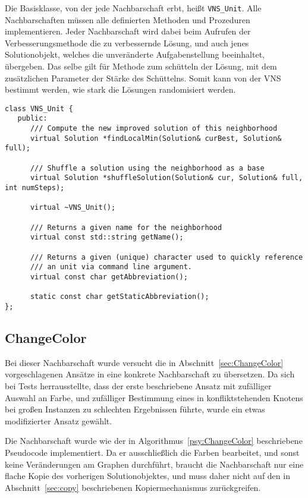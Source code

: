Die Basisklasse, von der jede Nachbarschaft erbt, heißt \texttt{VNS\_Unit}. Alle Nachbarschaften müssen alle definierten Methoden und Prozeduren implementieren. Jeder Nachbarschaft wird dabei beim Aufrufen der
Verbesserungsmethode die zu verbessernde Lösung, und auch jenes Solutionobjekt, welches die unveränderte Aufgabenstellung beeinhaltet, übergeben. Das selbe gilt für Methode zum schütteln der Lösung, mit dem
zusätzlichen Parameter der Stärke des Schüttelns. Somit kann von der VNS bestimmt werden, wie stark die Lösungen randomisiert werden. 

\singlespacing
\begin{lstlisting}[caption={Signatur der Basisklasse \texttt{VNS\_Unit}, von welcher alle Nachbarschaften erben},label={lst:vnsunit}]
class VNS_Unit {
   public:
      /// Compute the new improved solution of this neighborhood
      virtual Solution *findLocalMin(Solution& curBest, Solution& full);

      /// Shuffle a solution using the neighborhood as a base
      virtual Solution *shuffleSolution(Solution& cur, Solution& full, int numSteps);
   
      virtual ~VNS_Unit();
      
      /// Returns a given name for the neighborhood
      virtual const std::string getName();

      /// Returns a given (unique) character used to quickly reference
      /// an unit via command line argument.
      virtual const char getAbbreviation();
      
      static const char getStaticAbbreviation();
};
\end{lstlisting}

\subsection{ChangeColor}
Bei dieser Nachbarschaft wurde versucht die in Abschnitt~\ref{sec:ChangeColor} vorgeschlagenen Ansätze in eine konkrete Nachbarschaft zu übersetzen. Da sich bei Tests herrausstellte, dass der erste beschriebene Ansatz
mit zufälliger Auswahl an Farbe, und zufälliger Bestimmung eines in konfliktstehenden Knotens bei großen Instanzen zu schlechten Ergebnissen führte, wurde ein etwas modifizierter Ansatz gewählt.

Die Nachbarschaft wurde wie der in Algorithmus~\ref{psy:ChangeColor} beschriebene Pseudocode implementiert. Da er ausschließlich die Farben bearbeitet, und sonst keine Veränderungen am Graphen durchführt,
braucht die Nachbarschaft nur eine flache Kopie des vorherigen Solutionobjektes, und muss daher nicht auf den in Abschnitt~\ref{sec:copy} beschriebenen Kopiermechanismus zurückgreifen. 

